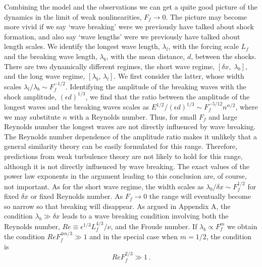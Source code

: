 \documentclass{jfm}
\begin{document}
Combining the model and the observations we can get a quite good picture of the
dynamics in the limit of weak nonlinearities, $ F_{f} \rightarrow 0 $. The
picture may become more vivid if we say `wave breaking' were we previously have
talked about shock formation, and also say `wave lengths' were we previously
have talked about length scales. We identify the longest wave length, $
\lambda_l $, with the forcing scale $ L_f $ and the breaking wave length, $
\lambda_b $, with the mean distance, $ d $, between the shocks. There are two
dynamically different regimes, the short wave regime, $ [\delta x, \;
\lambda_b] $, and the long wave regime, $ [\lambda_b, \, \lambda_l] $. We first
consider the latter, whose width scales $ \lambda_{l} /\lambda_b \sim
F_f^{-1/2} $. Identifying the amplitude of the breaking waves with the shock
amplitude, $ (\epsilon d)^{1/3} $, we find that the ratio between the amplitude of
the longest waves and the breaking waves scales as $ E^{1/2}/(\epsilon d)^{1/3}
\sim F_{f}^{-5/12} n^{\alpha/2} $, where we may substitute $ n $ with a
Reynolds number. Thus, for small $ F_f $ and large Reynolds
number the longest waves are not directly influenced by wave breaking. The
Reynolds number dependence of the amplitude ratio makes it unlikely that a
general similarity theory can be easily formulated for this range. Therefore,
predictions from weak turbulence theory \cite[for
example][]{ZakharovSagdeev1970} are not likely to hold for this range, although
it is not directly influenced by wave breaking. The exact values of the power
law exponents in the argument leading to this conclusion are, of course, not
important. As for the short wave regime, the width scales as $ \lambda_b
/\delta x \sim F_f^{1/2} $ for fixed $ \delta x $ or fixed Reynolds number. As
$ F_{f} \rightarrow 0 $ the range will eventually become so narrow so that
breaking will disappear. As argued in Appendix A, the condition $ \lambda_b \gg \delta x $ leads to a wave breaking condition involving both the Reynolds number,  $ Re  \equiv \epsilon^{1/3} L_f^{4/3} /  \nu $, and  the Froude number. If $ \lambda_b \propto F_f^{m} $ we obtain the condition $ Re F_f^{4m/3} \gg 1 $ and in the special case when $ m = 1/2 $, the condition is 
\begin{equation} \label{WC}
Re F_f^{2/3} \gg 1 \, .
\end{equation} 
\end{document}
